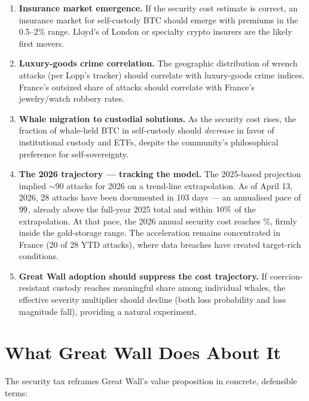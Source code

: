 \documentclass[a4paper,11pt]{article}
\def\SevMult{6}          %
\def\JewPure{0.009}      %
\def\JewCrime{229}       %
\def\UnderMult{3}        %
\edef\kappa{\fpeval{\SevMult * \JewPure / \JewCrime}}
\def\aXXVIytd{28}     %
\def\daysXXVI{103}    %
\def\wXXVI{1100}
\edef\aXXVIann{\fpeval{\aXXVIytd * 365 / \daysXXVI}}
\edef\rhoXXVI{\fpeval{\aXXVIann * \UnderMult * 100 / \wXXVI}}
\edef\cXXVI{\fpeval{\rhoXXVI * \kappa}}
\begin{document}
\begin{enumerate}[leftmargin=1.5em]
  \item \textbf{Insurance market emergence.} If the security cost estimate is correct, an insurance market for self-custody BTC should emerge with premiums in the 0.5--2\% range. Lloyd's of London or specialty crypto insurers are the likely first movers.
  \item \textbf{Luxury-goods crime correlation.} The geographic distribution of wrench attacks (per Lopp's tracker) should correlate with luxury-goods crime indices. France's outsized share of attacks should correlate with France's jewelry/watch robbery rates.
  \item \textbf{Whale migration to custodial solutions.} As the security cost rises, the fraction of whale-held BTC in self-custody should \textit{decrease} in favor of institutional custody and ETFs, despite the community's philosophical preference for self-sovereignty.
  \item \textbf{The 2026 trajectory --- tracking the model.} The 2025-based projection implied $\sim$90 attacks for 2026 on a trend-line extrapolation. As of April 13, 2026, \aXXVIytd{} attacks have been documented in 103 days --- an annualised pace of $\fpeval{round(\aXXVIann, 0)}$, already above the full-year 2025 total and within $\fpeval{round(abs(\aXXVIann / 90 - 1) * 100, 0)}\%$ of the extrapolation. At that pace, the 2026 annual security cost reaches \fpeval{round(\cXXVI * 100, 3)}\%, firmly inside the gold-storage range. The acceleration remains concentrated in France (20 of \aXXVIytd{} YTD attacks), where data breaches have created target-rich conditions.
  \item \textbf{Great Wall adoption should suppress the cost trajectory.} If coercion-resistant custody reaches meaningful share among individual whales, the effective severity multiplier should decline (both loss probability and loss magnitude fall), providing a natural experiment.
\end{enumerate}

\section{What Great Wall Does About It}

The security tax reframes Great Wall's value proposition in concrete, defensible terms:
\end{document}
